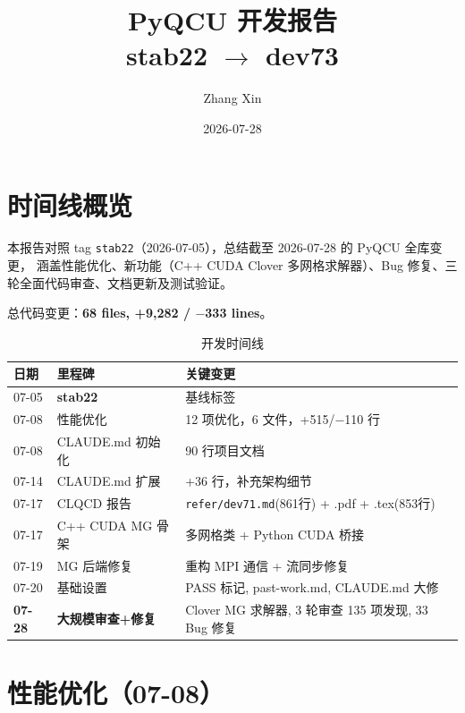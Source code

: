 \documentclass[11pt,a4paper]{article}
\title{\textbf{PyQCU 开发报告}\\
\large stab22 $\rightarrow$ dev73}
\author{Zhang Xin}
\date{2026-07-28}
\begin{document}
\maketitle
\tableofcontents
\newpage

\section{时间线概览}

本报告对照 tag \texttt{stab22}（2026-07-05），总结截至 2026-07-28 的 PyQCU 全库变更，
涵盖性能优化、新功能（C++ CUDA Clover 多网格求解器）、Bug 修复、三轮全面代码审查、文档更新及测试验证。

总代码变更：\textbf{68 files, +9,282 / $-$333 lines}。

\begin{table}[ht]
\centering
\caption{开发时间线}
\begin{tabular}{lll}
\toprule
日期 & 里程碑 & 关键变更 \\
\midrule
07-05 & \textbf{stab22} & 基线标签 \\
07-08 & 性能优化 & 12 项优化，6 文件，+515/$-$110 行 \\
07-08 & CLAUDE.md 初始化 & 90 行项目文档 \\
07-14 & CLAUDE.md 扩展 & +36 行，补充架构细节 \\
07-17 & CLQCD 报告 & \texttt{refer/dev71.md}(861行) + .pdf + .tex(853行) \\
07-17 & C++ CUDA MG 骨架 & 多网格类 + Python CUDA 桥接 \\
07-19 & MG 后端修复 & 重构 MPI 通信 + 流同步修复 \\
07-20 & 基础设置 & PASS 标记, past-work.md, CLAUDE.md 大修 \\
\textbf{07-28} & \textbf{大规模审查+修复} & Clover MG 求解器, 3 轮审查 135 项发现, 33 Bug 修复 \\
\bottomrule
\end{tabular}
\end{table}

\section{性能优化（07-08）}
\end{document}
